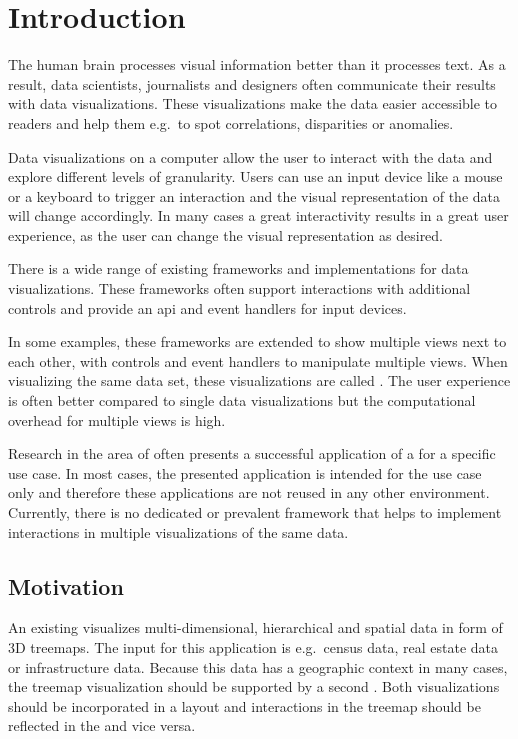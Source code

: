 \chapter{Introduction}
The human brain processes visual information better than it processes text.
As a result, data scientists, journalists and designers often communicate their results with data visualizations.
These visualizations make the data easier accessible to readers and help them e.g.\ to spot correlations, disparities or anomalies.

Data visualizations on a computer allow the user to interact with the data and explore different levels of granularity.
Users can use an input device like a mouse or a keyboard to trigger an interaction and the visual representation of the data will change accordingly.
In many cases a great interactivity results in a great user experience, as the user can change the visual representation as desired.

There is a wide range of existing frameworks and implementations for data visualizations.
These frameworks often support interactions with additional controls and provide an \gls{api} and event handlers for input devices.

In some examples, these frameworks are extended to show multiple views next to each other, with controls and event handlers to manipulate multiple views.
When visualizing the same data set, these visualizations are called \cmvs{}.
The user experience is often better compared to single data visualizations but the computational overhead for multiple views is high.

Research in the area of \cmvs{} often presents a successful application of a \cmv{} for a specific use case.
In most cases, the presented application is intended for the use case only and therefore these applications are not reused in any other environment.
Currently, there is no dedicated or prevalent framework that helps to implement interactions in multiple visualizations of the same data.


\section{Motivation}\label{sec:outline}
An existing \visan{} visualizes multi-dimensional, hierarchical and spatial data in form of 3D treemaps.
The input for this application is e.g.\ census data, real estate data or infrastructure data.
Because this data has a geographic context in many cases, the treemap visualization should be supported by a second \gv{}.
Both visualizations should be incorporated in a \cmv{} layout and interactions in the treemap should be reflected in the \gv{} and vice versa.

